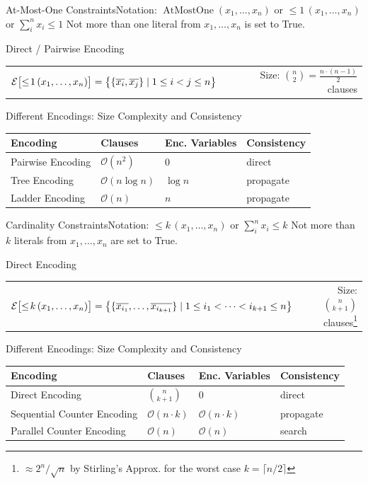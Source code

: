 \documentclass[t]{sdqbeamer}
\begin{document}
\begin{frame}{At-Most-One Constraints}{Notation: $\operatorname{AtMostOne}(x_1, \dots, x_n)$ or $\leq\!1\,(x_1, \dots, x_n)$ or $\sum_i^n x_i \leq 1$}
	Not more than one literal from $x_1, \dots, x_n$ is set to True.

	\begin{block}{Direct / Pairwise Encoding}
		\begin{tabularx}{\linewidth}{LR}
		$\mathcal{E}\bigl[\leq\!1\,(x_1, \dots, x_n)\bigr] = \bigl\{ \{\overline{x_i}, \overline{x_j} \} \mid 1 \leq i < j \leq n \bigr\}$ 
		& Size: ${n \choose 2} = \frac{n \cdot (n-1)}{2}$ clauses
		\end{tabularx}
	\end{block}
	\pause
	\begin{block}{Different Encodings: Size Complexity and Consistency}
		\centering\setcolsep{10pt}
		\begin{tabularx}{\linewidth}{XlXl}
			\bf Encoding & \bf Clauses & \bf Enc. Variables & \bf Consistency \\
			\hline
			Pairwise Encoding & $\mathcal{O}(n^2)$ & 0 & direct \\
			Tree Encoding & $\mathcal{O}(n \log n)$ & $\log n$ & propagate \\
			Ladder Encoding & $\mathcal{O}(n)$ & $n$ & propagate
		\end{tabularx}
	\end{block}
\end{frame}

\begin{frame}{Cardinality Constraints}{Notation: $\leq\!k\,(x_1, \dots, x_n)$ or $\sum_i^n x_i \leq k$}
	Not more than $k$ literals from $x_1, \dots, x_n$ are set to True.
	\begin{block}{Direct Encoding}
		\begin{tabularx}{\linewidth}{lR}
			$\mathcal{E}\bigl[\leq\!k\,(x_1, \dots, x_n)\bigr] = \bigl\{ \{\overline{x_{i_1}}, \dots, \overline{x_{i_{k+1}}} \} \mid 1 \leq i_1 < \dots < i_{k+1} \leq n \bigr\}$ 
			& Size: ${n \choose k+1}$ clauses\footnote{$\approx 2^n/\sqrt{n}$ by Stirling's Approx. for the worst case $k = \lceil n/2 \rceil$}
		\end{tabularx}
	\end{block}
	\pause
	\begin{block}{Different Encodings: Size Complexity and Consistency}
		\centering\setcolsep{10pt}
		\begin{tabularx}{\linewidth}{XlXl}
			\bf Encoding & \bf Clauses & \bf Enc. Variables & \bf Consistency \\
			\hline
			Direct Encoding & ${n \choose k+1}$ & 0 & direct\\
			Sequential Counter Encoding & $\mathcal{O}(n \cdot k)$ & $\mathcal{O}(n \cdot k)$ & propagate \\
			Parallel Counter Encoding & $\mathcal{O}(n)$ & $\mathcal{O}(n)$ & search
		\end{tabularx}
	\end{block}
\end{frame}
\end{document}
